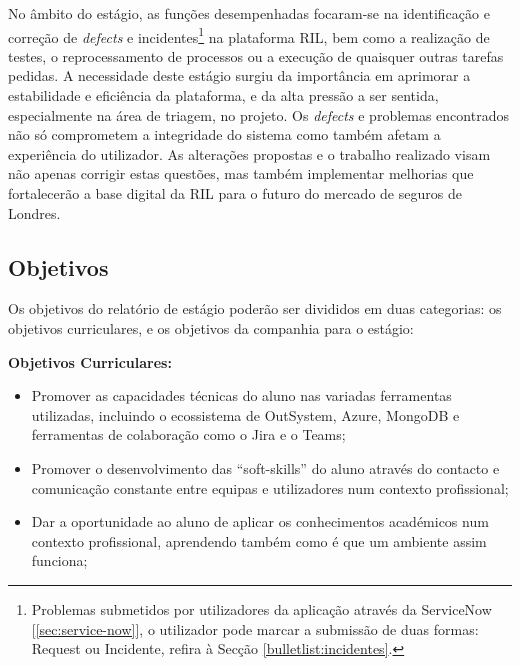         No âmbito do estágio, as funções desempenhadas focaram-se na identificação e correção de \textit{defects} e incidentes\footnote{Problemas submetidos por utilizadores da aplicação através da ServiceNow [\ref{sec:service-now}], o utilizador pode marcar a submissão de duas formas: Request ou Incidente, refira à Secção \ref{bulletlist:incidentes}.} na plataforma RIL, bem como a realização de testes, o reprocessamento de processos ou a execução de quaisquer outras tarefas pedidas. A necessidade deste estágio surgiu da importância em aprimorar a estabilidade e eficiência da plataforma, e da alta pressão a ser sentida, especialmente na área de triagem, no projeto. Os \textit{defects} e problemas encontrados não só comprometem a integridade do sistema como também afetam a experiência do utilizador. As alterações propostas e o trabalho realizado visam não apenas corrigir estas questões, mas também implementar melhorias que fortalecerão a base digital da RIL para o futuro do mercado de seguros de Londres.

    
    \subsection{Objetivos}\label{subsec:objetivos}

        Os objetivos do relatório de estágio poderão ser divididos em duas categorias: os objetivos curriculares, e os objetivos da companhia para o estágio:
    
        \textbf{Objetivos Curriculares:}
        \begin{itemize}
          \item Promover as capacidades técnicas do aluno nas variadas ferramentas utilizadas, incluindo o ecossistema de OutSystem, Azure, MongoDB e ferramentas de colaboração como o Jira e o Teams;
          \item Promover o desenvolvimento das ``soft-skills'' do aluno através do contacto e comunicação constante entre equipas e utilizadores num contexto profissional;
          \item Dar a oportunidade ao aluno de aplicar os conhecimentos académicos num contexto profissional, aprendendo também como é que um ambiente assim funciona;
        \end{itemize}
    
